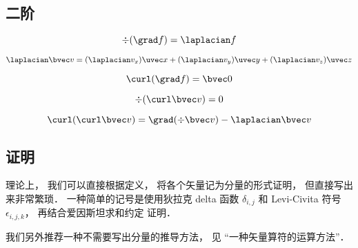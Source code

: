 \subsection{二阶}

\begin{equation}
\div (\grad f) = \laplacian f
\end{equation}

\begin{equation}
\laplacian \bvec v = (\laplacian v_x) \uvec x + (\laplacian v_y) \uvec y + (\laplacian v_z)\uvec z
\end{equation}

\begin{equation}
\curl (\grad f) = \bvec 0
\end{equation}

\begin{equation}
\div (\curl \bvec v) = 0
\end{equation}

\begin{equation}
\curl(\curl \bvec v) = \grad(\div\bvec v) - \laplacian \bvec v
\end{equation}

\subsection{证明}
理论上， 我们可以直接根据定义， 将各个矢量记为分量的形式证明， 但直接写出来非常繁琐． 一种简单的记号是使用狄拉克 delta 函数 $\delta_{i,j}$ 和 Levi-Civita 符号 $\epsilon_{i,j,k}$， 再结合爱因斯坦求和约定%
证明．

我们另外推荐一种不需要写出分量的推导方法， 见 “一种矢量算符的运算方法”．
